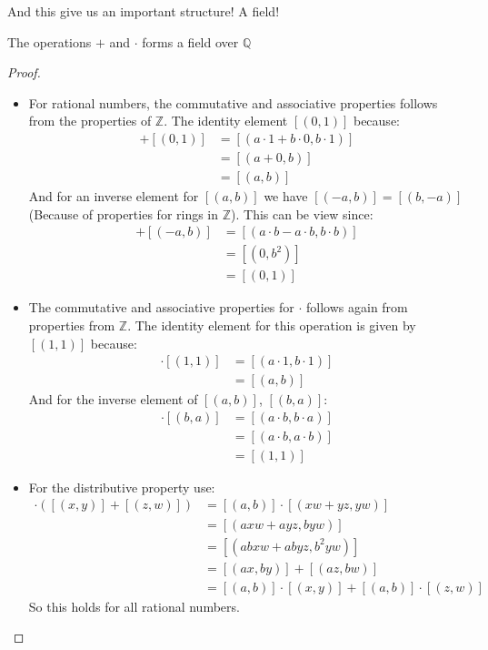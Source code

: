\documentclass{tufte-handout}
\begin{document}
And this give us an important structure! A field!

\begin{theorem}
	The operations $+$ and $\cdot$ forms a field over $\mathbb{Q}$
\end{theorem}
\begin{proof}
	\begin{itemize}
		\item For rational numbers, the commutative and associative properties follows from the properties of $\mathbb{Z}$. The identity element $[(0, 1)]$ because:
		\begin{align*}
			[(a, b)] + [(0, 1)] &= [(a\cdot 1 + b \cdot 0, b \cdot 1)]\\
			&= [(a + 0, b)]\\
			&= [(a, b)]
		\end{align*}
		And for an inverse element for $[(a, b)]$ we have $[(-a, b)] = [(b, -a)]$(Because of properties for rings in $\mathbb{Z}$). This can be view since:
		\begin{align*}
			[(a, b)] + [(-a, b)] &= [(a \cdot b - a \cdot b, b \cdot b)]\\
			&= [(0, b^2)]\\
			&= [(0, 1)]
		\end{align*}

		\item The commutative and associative properties for $\cdot$ follows again from properties from $\mathbb{Z}$. The identity element for this operation is given by $[(1, 1)]$ because:
		\begin{align*}
			[(a, b)] \cdot [(1, 1)] &= [(a \cdot 1, b \cdot 1)]\\
			&= [(a, b)]
		\end{align*}
		And for the inverse element of $[(a, b)]$, $[(b, a)]$:
		\begin{align*}
			[(a, b)] \cdot [(b, a)] &= [(a\cdot b, b \cdot a)]\\
			&= [(a \cdot b, a \cdot b)]\\
			&= [(1, 1)]
		\end{align*}

		\item For the distributive property use:
		\begin{align*}
			[(a, b)] \cdot ([(x, y)] + [(z, w)]) &= [(a, b)] \cdot [(xw+yz, yw)]\\
			&= [(axw+ayz, byw)]\\
			&= [(abxw + abyz, b^2yw)]\\
			&= [(ax, by)] + [(az, bw)]\\
			&= [(a, b)] \cdot [(x,y)] + [(a, b)] \cdot [(z, w)]
		\end{align*}
		So this holds for all rational numbers.
	\end{itemize}
\end{proof}
\end{document}
